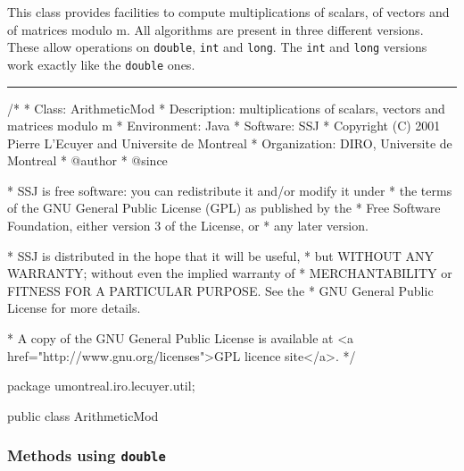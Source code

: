 
This class provides facilities to compute multiplications of scalars, of
vectors and of matrices modulo m. All algorithms are present in three
different versions. These allow operations on \texttt{double}, \texttt{int} and
\texttt{long}. The \texttt{int} and \texttt{long} versions work exactly like the
\texttt{double} ones.

\bigskip\hrule

\begin{code}\begin{hide}
/*
 * Class:        ArithmeticMod
 * Description:  multiplications of scalars, vectors and matrices modulo m
 * Environment:  Java
 * Software:     SSJ
 * Copyright (C) 2001  Pierre L'Ecuyer and Universite de Montreal
 * Organization: DIRO, Universite de Montreal
 * @author
 * @since

 * SSJ is free software: you can redistribute it and/or modify it under
 * the terms of the GNU General Public License (GPL) as published by the
 * Free Software Foundation, either version 3 of the License, or
 * any later version.

 * SSJ is distributed in the hope that it will be useful,
 * but WITHOUT ANY WARRANTY; without even the implied warranty of
 * MERCHANTABILITY or FITNESS FOR A PARTICULAR PURPOSE.  See the
 * GNU General Public License for more details.

 * A copy of the GNU General Public License is available at
   <a href="http://www.gnu.org/licenses">GPL licence site</a>.
 */
\end{hide}
package umontreal.iro.lecuyer.util;


public class ArithmeticMod \begin{hide} {

   //private constants
   private static final double two17    =  131072.0;
   private static final double two53    =  9007199254740992.0;

   //prevent the creation of the object
   private ArithmeticMod() {};

 \end{hide}
\end{code}

\subsubsection* {Methods using \texttt{double}}

